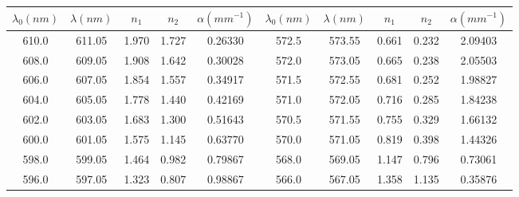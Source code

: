 \documentclass{thureport}
\begin{document}
\begin{table}[H]
    \centering
      \begin{tabular}{|c|c|c|c|c|c|c|c|c|c|}
      \hline
      $\lambda_0(nm)$ & $\lambda(nm)$ & $n_1$   & $n_2$   & $\alpha(mm^{-1})$ & $\lambda_0(nm)$ & $\lambda(nm)$ & $n_1$   & $n_2$   & $\alpha(mm^{-1})$ \bigstrut\\
      \hline
    610.0  & 611.05  & 1.970  & 1.727  & 0.26330  & 572.5  & 573.55  & 0.661  & 0.232  & 2.09403  \bigstrut\\
    \hline
    608.0  & 609.05  & 1.908  & 1.642  & 0.30028  & 572.0  & 573.05  & 0.665  & 0.238  & 2.05503  \bigstrut\\
    \hline
    606.0  & 607.05  & 1.854  & 1.557  & 0.34917  & 571.5  & 572.55  & 0.681  & 0.252  & 1.98827  \bigstrut\\
    \hline
    604.0  & 605.05  & 1.778  & 1.440  & 0.42169  & 571.0  & 572.05  & 0.716  & 0.285  & 1.84238  \bigstrut\\
    \hline
    602.0  & 603.05  & 1.683  & 1.300  & 0.51643  & 570.5  & 571.55  & 0.755  & 0.329  & 1.66132  \bigstrut\\
    \hline
    600.0  & 601.05  & 1.575  & 1.145  & 0.63770  & 570.0  & 571.05  & 0.819  & 0.398  & 1.44326  \bigstrut\\
    \hline
    598.0  & 599.05  & 1.464  & 0.982  & 0.79867  & 568.0  & 569.05  & 1.147  & 0.796  & 0.73061  \bigstrut\\
    \hline
    596.0  & 597.05  & 1.323  & 0.807  & 0.98867  & 566.0  & 567.05  & 1.358  & 1.135  & 0.35876  \bigstrut\\
    \hline
      \end{tabular}%
\end{table}%
\end{document}
